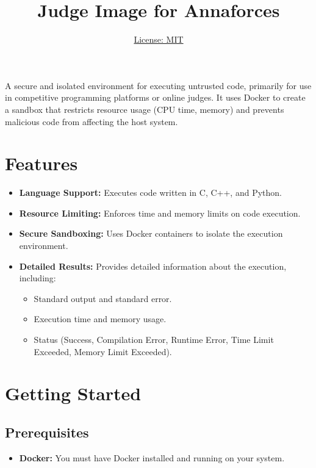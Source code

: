 \documentclass{article}
\title{Judge Image for Annaforces}
\author{\href{https://opensource.org/licenses/MIT}{License: MIT}}
\date{}
\begin{document}
\maketitle

A secure and isolated environment for executing untrusted code, primarily for use in competitive programming platforms or online judges. It uses Docker to create a sandbox that restricts resource usage (CPU time, memory) and prevents malicious code from affecting the host system.

\section{Features}
\begin{itemize}
    \item \textbf{Language Support:} Executes code written in C, C++, and Python.
    \item \textbf{Resource Limiting:} Enforces time and memory limits on code execution.
    \item \textbf{Secure Sandboxing:} Uses Docker containers to isolate the execution environment.
    \item \textbf{Detailed Results:} Provides detailed information about the execution, including:
    \begin{itemize}
        \item Standard output and standard error.
        \item Execution time and memory usage.
        \item Status (Success, Compilation Error, Runtime Error, Time Limit Exceeded, Memory Limit Exceeded).
    \end{itemize}
\end{itemize}

\section{Getting Started}

\subsection{Prerequisites}
\begin{itemize}
    \item \textbf{Docker:} You must have Docker installed and running on your system.
\end{itemize}
\end{document}
